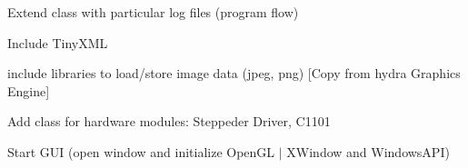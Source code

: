 
\begin{DoxyRefList}
\item[Class \mbox{\hyperlink{class_c_forge_1_1_s_logger}{C\+Forge\+::S\+Logger}} ]\label{todo__todo000001}%
%
Extend class with particular log files (program flow)


\item[page \mbox{\hyperlink{index}{Pi\+Forge Documentation}} ]\label{todo__todo000002}%
%
Include Tiny\+X\+ML 

\label{todo__todo000003}%
%
include libraries to load/store image data (jpeg, png) \mbox{[}Copy from hydra Graphics Engine\mbox{]} 

\label{todo__todo000004}%
%
Add class for hardware modules\+: Steppeder Driver, C1101 

\label{todo__todo000005}%
%
Start G\+UI (open window and initialize Open\+GL $\vert$ X\+Window and Windows\+A\+PI)
\end{DoxyRefList}